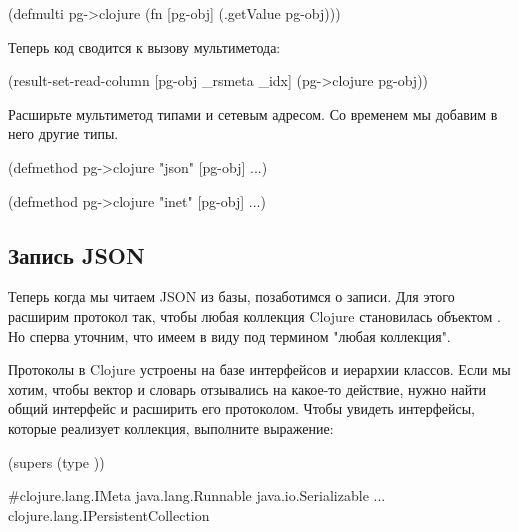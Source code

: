\begin{english}
  \begin{clojure}
(defmulti pg->clojure (fn [pg-obj]
                        (.getValue pg-obj)))
  \end{clojure}
\end{english}

Теперь код  сводится к вызову мультиметода:

\begin{english}
  \begin{clojure}
(result-set-read-column [pg-obj _rsmeta _idx]
  (pg->clojure pg-obj))
  \end{clojure}
\end{english}

Расширьте мультиметод типами  и сетевым адресом. Со временем мы добавим в него другие типы.

\begin{english}
  \begin{clojure}
(defmethod pg->clojure "json"
  [pg-obj] ...)

(defmethod pg->clojure "inet"
  [pg-obj] ...)
  \end{clojure}
\end{english}

\subsection{Запись JSON}

Теперь когда мы читаем JSON из базы, позаботимся о записи. Для этого расширим протокол  так, чтобы любая коллекция Clojure становилась объектом . Но сперва уточним, что имеем в виду под термином "любая коллекция".

Протоколы в Clojure устроены на базе интерфейсов и иерархии классов. Если мы хотим, чтобы вектор и словарь отзывались на какое-то действие, нужно найти общий интерфейс и расширить его протоколом. Чтобы увидеть интерфейсы, которые реализует коллекция, выполните выражение:

\begin{english}
  \begin{clojure}
(supers (type {}))

#{clojure.lang.IMeta
  java.lang.Runnable
  java.io.Serializable
  ...
  clojure.lang.IPersistentCollection}
  \end{clojure}
\end{english}

